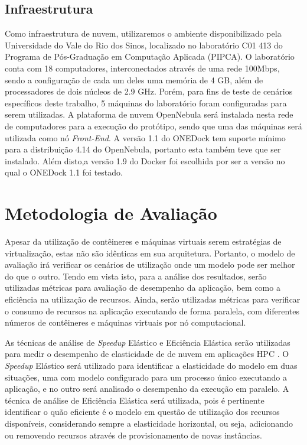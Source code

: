 \documentclass[twoside,english,brazilian]{UNISINOSartigo}
\begin{document}
\begin{itemize}
\subsection{Infraestrutura}

Como infraestrutura de nuvem, utilizaremos o ambiente disponibilizado pela Universidade do Vale do Rio dos Sinos, localizado no laboratório C01 413 do Programa de Pós-Graduação em Computação Aplicada (PIPCA). O laboratório conta com 18 computadores, interconectados através de uma rede 100Mbps, sendo a configuração de cada um deles uma memória de 4 GB, além de processadores de dois núcleos de 2.9 GHz. Porém, para fins de teste de cenários específicos deste trabalho, 5 máquinas do laboratório foram configuradas para serem utilizadas. A plataforma de nuvem OpenNebula será instalada nesta rede de computadores para a execução do protótipo, sendo que uma das máquinas será utilizada como nó \textit{Front-End}. 
A versão 1.1 do ONEDock tem suporte mínimo para a distribuição 4.14 do OpenNebula, portanto esta também teve que ser instalado. Além disto,a versão 1.9 do Docker foi escolhida por ser a versão no qual o ONEDock 1.1 foi testado. 


\section{Metodologia de Avaliação}
\label{avaliacao}

Apesar da utilização de contêineres e máquinas virtuais serem estratégias de virtualização, estas não são idênticas em sua arquitetura. Portanto, o modelo de avaliação irá verificar os cenários de utilização onde um modelo pode ser melhor do que o outro. Tendo em vista isto, para a análise dos resultados, serão utilizadas métricas para avaliação de desempenho da aplicação, bem como a eficiência na utilização de recursos. Ainda, serão utilizadas métricas para verificar o consumo de recursos na aplicação executando de forma paralela, com diferentes números de contêineres e máquinas virtuais por nó computacional. 

As técnicas de análise de \textit{Speedup} Elástico e Eficiência Elástica serão utilizadas para medir o desempenho de elasticidade de de nuvem em aplicações HPC \cite{Facco2016}. O \textit{Speedup} Elástico será utilizado para identificar a elasticidade do modelo em duas situações, uma com modelo configurado para um processo único executando a aplicação, e no outro será analisado o desempenho da execução em paralelo. A técnica de análise de Eficiência Elástica será utilizada, pois é pertinente identificar o quão eficiente é o modelo em questão de utilização dos recursos disponíveis, considerando sempre a elasticidade horizontal, ou seja, adicionando ou removendo recursos através de provisionamento de novas instâncias. 


\end{itemize}
\end{document}
